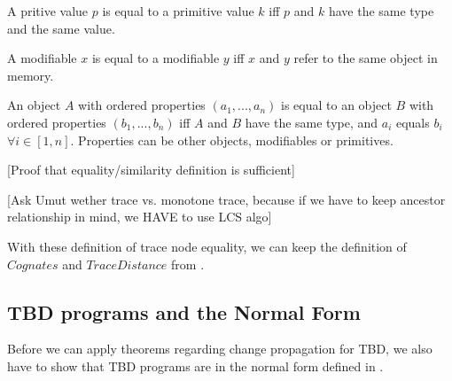\begin{definition}
A pritive value $p$ is equal to a primitive value $k$ iff $p$ and $k$ have the same type and the same value. 

A modifiable $x$ is equal to a modifiable $y$ iff $x$ and $y$ refer to the same object in memory.

An object $A$ with ordered properties $(a_1, ..., a_n)$ is equal to an object $B$ with ordered properties  $(b_1, ..., b_n)$ iff $A$ and $B$ have the same type, and $a_i$ equals $b_i$ $\forall i \in[1, n]$. Properties can be other objects, modifiables or primitives. 
\end{definition}

[Proof that equality/similarity definition is sufficient]

[Ask Umut wether trace vs. monotone trace, because if we have to keep ancestor relationship in mind, we HAVE to use LCS algo]

With these definition of trace node equality, we can keep the definition of $Cognates$ and $Trace Distance$ from \cite{Acar2005thesis}.  

\subsection{TBD programs and the Normal Form}
Before we can apply theorems regarding change propagation for TBD, we also have to show that TBD programs are in the normal form defined in \cite{Acar2005thesis}.